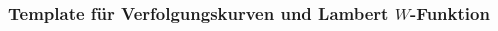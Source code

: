 %
%
%
\bgroup
\begin{frame}[t]
\setlength{\abovedisplayskip}{5pt}
\setlength{\belowdisplayskip}{5pt}
\frametitle{Template für Verfolgungskurven und Lambert $W$-Funktion}
\vspace{-20pt}
\begin{columns}[t,onlytextwidth]
\begin{column}{0.48\textwidth}
\end{column}
\begin{column}{0.48\textwidth}
\end{column}
\end{columns}
\end{frame}
\egroup
